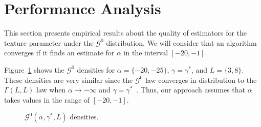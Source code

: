 \documentclass[twocolumn]{svjour3}
\begin{document}
	
	\section{Performance Analysis}\label{simulation}
	
	This section presents empirical results about the quality of estimators for the texture parameter under the $\mathcal G^0$ distribution. 
	We will consider that an algorithm converges if it finds an estimate for $\alpha$ in the interval $[-20,-1]$.    
	
	Figure~\ref{densidades} shows the $\mathcal{G}^0$ densities for  $\alpha=\{-20,-25\}$, $\gamma=\gamma^*$, and $L=\{3,8\}$. 
	These densities are very similar since the $\mathcal{G}^0$ law converges in distribution to the $\Gamma(L,L)$ law when $\alpha \to -\infty$ and $\gamma=\gamma^*$~\cite{Frery99}. 
	Thus, our approach assumes that $\alpha$ takes values in the range of $[-20,-1]$. 
	
	\begin{figure}[hbt]
		\centering
		\caption{$\mathcal{G}^0(\alpha,\gamma^*,L)$ densities.}\label{densidades} 
	\end{figure}
	
\end{document}
